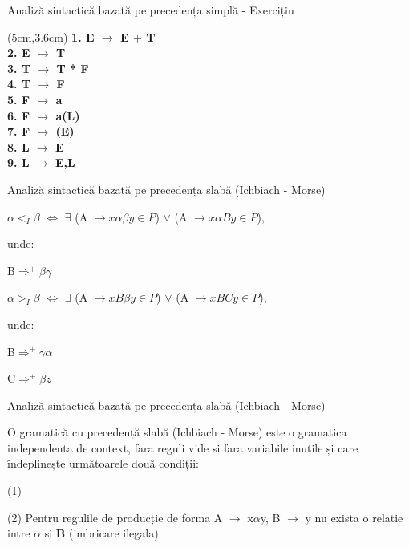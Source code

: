 \documentclass[pdf]{beamer}
\begin{document}
\begin{frame}{Analiză sintactică bazată pe precedența simplă - Exercițiu}    
    \begin{textblock*}{14cm}(5cm,3.6cm)
    \textbf{1. E $\rightarrow$ E $+$ T}\\
    \textbf{2. E $\to$ T}\\
    \textbf{3. T $\to$ T * F}\\
    \textbf{4. T $\to$ F}\\
    \textbf{5. F $\to$ a}\\
    \textbf{6. F $\to$ a(L)}\\
    \textbf{7. F $\to$ (E)}\\
    \textbf{8. L $\to$ E}\\
    \textbf{9. L $\to$ E,L}
    \end{textblock*}
\end{frame}



\begin{frame}
{Analiză sintactică bazată pe precedența slabă (Ichbiach - Morse)}

\newline

\color{black}{ (1)} \color{red} $\alpha <_{I} \beta$ \color{black} $\iff$ \color{blue} $\exists$ (A $\rightarrow x \alpha \beta y \in P$) $\lor$ (A $\rightarrow  x  \alpha By \in P$), 

unde:

B$\Rightarrow^+\beta\gamma$
\newline

\color{black}{ (2)} \color{red} $\alpha >_{I} \beta$ \color{black} $\iff$ $\exists$ \color{blue} (A $\rightarrow x B \beta y \in P$) $\lor$ (A $\rightarrow x B C y \in P$), 

unde:

B$\Rightarrow^+ \gamma \alpha$

C$\Rightarrow^+ \beta z$

\end{frame}



\begin{frame}
{Analiză sintactică bazată pe precedența slabă (Ichbiach - Morse)}

\newline

\color{black} O gramatică cu precedență slabă (Ichbiach - Morse) este o gramatica independenta de context, fara reguli vide si fara  variabile inutile și care îndeplinește următoarele două condiții:

(1) 

\color{black} 
(2) Pentru regulile de producție de forma \color{blue} A $\rightarrow$ x$\alpha$y, B $\rightarrow$ y \color{black} nu exista o relatie intre \color{red} {$\alpha$} \color{black} si \color{red}\textbf B \color{red} {(imbricare ilegala)}\color{black}

\end{frame}
\end{document}
